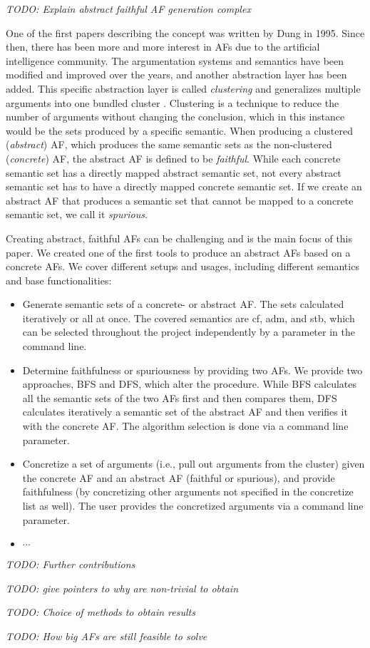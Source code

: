 \textit{TODO: Explain abstract faithful AF generation complex}

One of the first papers describing the concept was written by Dung \cite{Dung1995-DUNOTA-2} in 1995. Since then, there has been more and more interest in \acp{AF} due to the artificial intelligence community. The argumentation systems and semantics have been modified and improved over the years, and another abstraction layer has been added. This specific abstraction layer is called \emph{clustering} and generalizes multiple arguments into one bundled cluster \cite{DBLP:conf/kr/SaribaturW21}. Clustering is a technique to reduce the number of arguments without changing the conclusion, which in this instance would be the sets produced by a specific semantic. When producing a clustered (\emph{abstract}) \ac{AF}, which produces the same semantic sets as the non-clustered (\emph{concrete}) \ac{AF}, the abstract \ac{AF} is defined to be \emph{faithful}. While each concrete semantic set has a directly mapped abstract semantic set, not every abstract semantic set has to have a directly mapped concrete semantic set. If we create an abstract \ac{AF} that produces a semantic set that cannot be mapped to a concrete semantic set, we call it \emph{spurious}.

Creating abstract, faithful \acp{AF} can be challenging and is the main focus of this paper. We created one of the first tools \cite{Pasero2024-AFClustering-Repo} to produce an abstract \acp{AF} based on a concrete \acp{AF}. We cover different setups and usages, including different semantics and base functionalities:

\begin{itemize}
    \item Generate semantic sets of a concrete- or abstract \ac{AF}. The sets calculated iteratively or all at once. The covered semantics are \ac{cf}, \ac{adm}, and \ac{stb}, which can be selected throughout the project independently by a parameter in the command line.

    \item Determine faithfulness or spuriousness by providing two \acp{AF}. We provide two approaches, \ac{BFS} and \ac{DFS}, which alter the procedure. While \ac{BFS} calculates all the semantic sets of the two \acp{AF} first and then compares them, \ac{DFS} calculates iteratively a semantic set of the abstract \ac{AF} and then verifies it with the concrete \ac{AF}. The algorithm selection is done via a command line parameter.

    \item Concretize a set of arguments (i.e., pull out arguments from the cluster) given the concrete \ac{AF} and an abstract \ac{AF} (faithful or spurious), and provide faithfulness (by concretizing other arguments not specified in the concretize list as well). The user provides the concretized arguments via a command line parameter.
    
    \item $\cdots$
\end{itemize}

\noindent

\textit{TODO: Further contributions}

\textit{TODO: give pointers to why are non-trivial to obtain}

\textit{TODO: Choice of methods to obtain results}

\textit{TODO: How big AFs are still feasible to solve}


